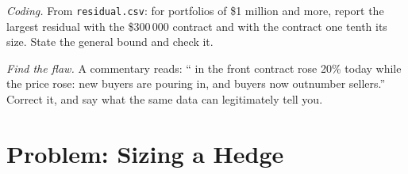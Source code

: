 \begin{exercise}[$\star\star\star$]\label{exo:m1:futures-contracts-and-exchanges:7}
\emph{Coding.} From \texttt{residual.csv}: for portfolios of \$1 million and
more, report the largest residual with the \$300\,000 contract and with the
contract one tenth its size. State the general bound and check it.
\end{exercise}

\begin{exercise}[$\star\star\star$]\label{exo:m1:futures-contracts-and-exchanges:8}
\emph{Find the flaw.} A commentary reads: `` in the front
contract rose 20\% today while the price rose: new buyers are pouring in, and
buyers now outnumber sellers.'' Correct it, and say what the same data can
legitimately tell you.
\end{exercise}

\section{Problem: Sizing a Hedge}

